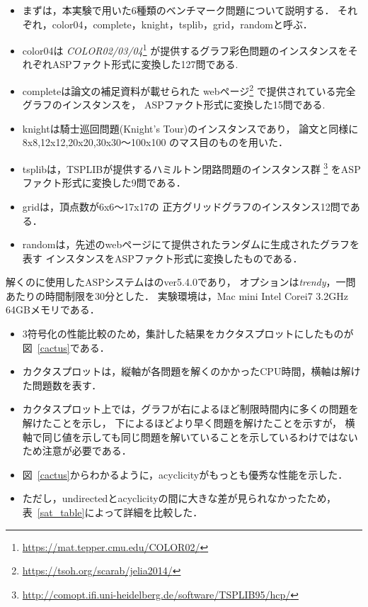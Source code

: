 \begin{itemize}
\item まずは，本実験で用いた6種類のベンチマーク問題について説明する．
それぞれ，color04，complete，knight，tsplib，grid，randomと呼ぶ．
\item color04は
  \textit{COLOR02/03/04}\footnote{\url{https://mat.tepper.cmu.edu/COLOR02/}}
  が提供するグラフ彩色問題のインスタンスをそれぞれASPファクト形式に変換した127問である.
\item completeは論文\cite{soh14:jelia2014}の補足資料が載せられた
  webページ\footnote{\url{https://tsoh.org/scarab/jelia2014/}}
  で提供されている完全グラフのインスタンスを，
  ASPファクト形式に変換した15問である.
\item knightは騎士巡回問題(Knight's Tour)のインスタンスであり，
  論文\cite{soh14:jelia2014}と同様に8x8,12x12,20x20,30x30〜100x100
  のマス目のものを用いた．
\item tsplibは，TSPLIBが提供するハミルトン閉路問題のインスタンス群
  \footnote{\url{http://comopt.ifi.uni-heidelberg.de/software/TSPLIB95/hcp/}}
  をASPファクト形式に変換した9問である．
\item gridは，頂点数が6x6〜17x17の
  正方グリッドグラフのインスタンス12問である．
\item randomは，先述のwebページ\footnotemark[1]
  にて提供されたランダムに生成されたグラフを表す
  インスタンスをASPファクト形式に変換したものである．
\end{itemize}

解くのに使用したASPシステムは{\clingo}のver5.4.0であり，
オプションは\textit{trendy}，一問あたりの時間制限を30分とした．
実験環境は，Mac mini Intel Corei7 3.2GHz 64GBメモリである．

\begin{itemize}
\item 3符号化の性能比較のため，集計した結果をカクタスプロットにしたものが図~\ref{cactus}である．
\item カクタスプロットは，縦軸が各問題を解くのかかったCPU時間，横軸は解けた問題数を表す．
\item カクタスプロット上では，グラフが右によるほど制限時間内に多くの問題を解けたことを示し，
  下によるほどより早く問題を解けたことを示すが，
  横軸で同じ値を示しても同じ問題を解いていることを示しているわけではないため注意が必要である．
\item 図~\ref{cactus}からわかるように，\textsf{acyclicity}がもっとも優秀な性能を示した．
\item ただし，\textsf{undirected}と\textsf{acyclicity}の間に大きな差が見られなかったため，
  表~\ref{sat_table}によって詳細を比較した．
\end{itemize}

